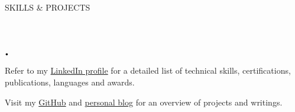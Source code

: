 \documentclass{article}
\newcommand{\header}[1]{
    {
        \hspace*{-4pt}
        \vspace*{8pt}
        \uppercase{#1}
    }
    \vspace*{-4pt} 
    \lineunder
    \vspace*{8pt}
}
\newcommand{\lineunder}{
    \vspace*{-8pt} \\ 
    \hspace*{-4pt} 
    \hrulefill \\
}
\newcommand{\spacedbullet}{
    $\vcenter{\hbox{\tiny$\bullet$}}$\hspace*{-2pt}
}
\newenvironment{bulletlist}{
    \begin{list}
        {\spacedbullet}{\setlength\leftmargin{10pt} 
        \topsep 0pt \itemsep -2pt}}{\vspace*{4pt}
    \end{list}
}
\begin{document}
\vspace*{4pt}
\header{Skills \& Projects}
\begin{bulletlist}
    \item Refer to my \href{https://linkedin.com/in/nielsdegrande/}{LinkedIn profile} for a detailed list of technical skills, certifications, publications, languages and awards.
    \item Visit my \href{https://github.com/NielsDegrande/}{GitHub} and \href{https://niels.degran.de/blog}{personal blog} for an overview of projects and writings.
\end{bulletlist}
\end{document}
